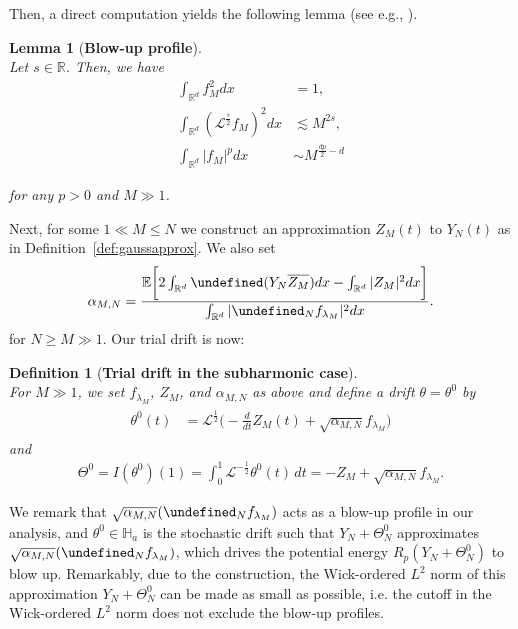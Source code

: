 \documentclass[%
11pt,  reqno]{amsart}
\newtheorem{lemma}[theorem]{Lemma}
\newtheorem{definition}[theorem]{Definition}
\theoremstyle{remarkstyle}
\newcommand{\1}{\hspace{0.2mm}\text{I}\hspace{0.2mm}}
\newcommand{\noi}{\noindent}
\newcommand{\R}{\mathbb{R}}
\let\Re=\undefined\DeclareMathOperator*{\Re}{Re}
\let\P= \undefined
\newcommand{\P}{\mathbf{P}}
\newcommand{\E}{\mathbb{E}}
\renewcommand{\L}{\mathcal{L}}
\newcommand{\al}{\alpha}
\newcommand{\ld}{\lambda}
\newcommand{\cj}{\overline}
\newcommand{\les}{\lesssim}
\numberwithin{equation}{section}
\numberwithin{theorem}{section}
\newcommand{\dr}{\theta}
\newcommand{\Dr}{\Theta}
\begin{document}
	\noi
	Then, a direct computation yields  the following lemma (see e.g., \cite[Lemma 4.1]{RSTW22}).
	
	\begin{lemma}[\textbf{Blow-up profile}]\mbox{} \label{LEM:soliton}\\
		Let $s \in \R$. Then, we have
		\begin{align}
			\int_{{\R^d}} f_{M}^2 dx &= 1 , \label{fM0} \\
			\int_{{\R^d}} (\L^{\frac{s}2} f_{M})^2 dx &\les M^{2s}, \label{fm2} \\
			\int_{{\R^d}}  |f_{M}|^p  dx &\sim M^{\frac{dp}2-d} \label{fM1}
		\end{align}
		
		\noi
		for any $p>0$ and $M \gg 1$.
	\end{lemma}
	
	
	Next, for some $1 \ll M \leq N$ we construct an approximation $Z_M (t)$ to $Y_N (t)$ as in Definition~\ref{def:gaussapprox}. We also set
	\begin{align} 
		\al_{M, N}= \frac {\E \bigg[ 2  \int_{\R^d} \Re(Y_N \cj{Z_M}) dx-\int_{\R^d}|Z_M|^2  dx \bigg]}{\int_{\R^d} |\P_{N}f_{\ld_M}|^2 dx}.
		\label{fmb1}
	\end{align}
	for $N\ge M \gg 1$. Our trial drift is now:
	
	\begin{definition}[\textbf{Trial drift in the subharmonic case}]\label{def:trial 1}\mbox{}\\
		For $M \gg 1$, we set $f_{\ld_M}$, $Z_M$, and $ \al_{M, N}$ as above and define a drift $\dr= \dr^0$ by 
		\begin{align}
			\begin{split}
				\dr^0 (t) 
				& = \L^{\frac12} \bigg( -\frac{d}{dt} Z_M(t) + \sqrt{ \al_{M, N}} f_{\ld_M} \bigg)
			\end{split}
			\label{drift}
		\end{align}
		and
		\begin{align}
			\Dr^0 = I(\theta^0)(1) 
			= \int_0^1 \L^{-\frac12} \dr^0(t) \, dt = - Z_M + \sqrt{ \al_{M, N}} f_{\ld_M}.
			\label{paa0}
		\end{align} 
	\end{definition}
	
	We remark that $\sqrt{\al_{M,N}} 
	(\P_{N} f_{\ld_M})$ acts as a blow-up profile in our analysis, 
	and $\theta^0 \in \mathbb H_a$ is the stochastic drift such that $Y_N + \Theta^0_N$ approximates $  \sqrt{\al_{M,N}} 
	(\P_{N} f_{\ld_M})$,
	which drives the potential energy $R_p(Y_N + \Theta^0_N)$ to blow up.
	Remarkably,  due to the construction, 
	the Wick-ordered $L^2$ norm of this approximation $Y_N + \Theta^0_N$ can be made as small as possible, i.e. the cutoff in the Wick-ordered $L^2$ norm does not exclude the blow-up profiles. 
	
\end{document}
